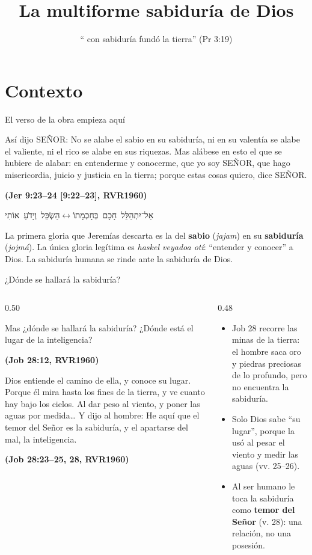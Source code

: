 \documentclass[hyperref={bookmarks=false},aspectratio=169]{beamer}
\title[La sabiduría]{\bfseries{La multiforme sabiduría de Dios}}
\subtitle{``\SENOR{} con sabiduría fundó la tierra'' (Pr 3:19)}
\author{}\institute{}\date{}
\newcommand{\heb}[1]{\mbox{\foreignlanguage{hebrew}{#1}}}
\newcommand{\SENOR}{S{\fontsize{0.78em}{1em}\selectfont EÑOR}}
\newcommand{\fuente}[1]{\par\hfill{\upshape\bfseries\footnotesize\textcolor{azul}{#1}}}
\newcommand{\destacar}[1]{\textbf{\textcolor{azul}{#1}}}
\begin{document}
\frame{\titlepage}


\section{Contexto}

\begin{frame}{El verso de la obra empieza aquí}
\begin{cita}Así dijo \SENOR: No se alabe el sabio en su sabiduría, ni en su valentía se alabe el valiente, ni el rico se alabe en sus riquezas. Mas alábese en esto el que se hubiere de alabar: en entenderme y conocerme, que yo soy \SENOR, que hago misericordia, juicio y justicia en la tierra; porque estas cosas quiero, dice \SENOR.\fuente{(Jer 9:23--24 [9:22--23], RVR1960)}\end{cita}
\begin{center}\heb{אַל־יִתְהַלֵּל חָכָם בְּחָכְמָתוֹ}\quad$\longleftrightarrow$\quad\heb{הַשְׂכֵּל וְיָדֹעַ אוֹתִי}\end{center}
\small\RaggedRight La primera gloria que Jeremías descarta es la del \destacar{sabio} (\emph{jajam}) en su \destacar{sabiduría} (\emph{jojmá}). La única gloria legítima es \emph{haskel veyadoa otí}: ``entender y conocer'' a Dios. La sabiduría humana se rinde ante la sabiduría de Dios.
\end{frame}

\begin{frame}{¿Dónde se hallará la sabiduría?}
\begin{columns}[t,onlytextwidth]
\begin{column}{0.50\textwidth}
\begin{cita}Mas ¿dónde se hallará la sabiduría? ¿Dónde está el lugar de la inteligencia?\fuente{(Job 28:12, RVR1960)}\end{cita}
\begin{cita}Dios entiende el camino de ella, y conoce su lugar. Porque él mira hasta los fines de la tierra, y ve cuanto hay bajo los cielos. Al dar peso al viento, y poner las aguas por medida\ldots{} Y dijo al hombre: He aquí que el temor del Señor es la sabiduría, y el apartarse del mal, la inteligencia.\fuente{(Job 28:23--25, 28, RVR1960)}\end{cita}
\end{column}
\begin{column}{0.48\textwidth}\small
\begin{itemize}
\item Job 28 recorre las minas de la tierra: el hombre saca oro y piedras preciosas de lo profundo, pero no encuentra la sabiduría.
\item Solo Dios sabe ``su lugar'', porque la usó al pesar el viento y medir las aguas (vv. 25--26).
\item Al ser humano le toca la sabiduría como \destacar{temor del Señor} (v. 28): una relación, no una posesión.
\end{itemize}
\end{column}
\end{columns}
\end{frame}
\end{document}
